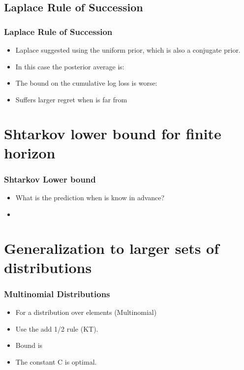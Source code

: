 \documentclass{beamer}
\begin{document}
\subsection{Laplace Rule of Succession}
\begin{frame}
\frametitle{Laplace Rule of Succession}
\begin{itemize}
\item
Laplace suggested using the uniform prior, which is also a conjugate prior.
\item In this case the posterior average is:
\R{\[
\frac{\int_0^1 \theta^{n+1} (1-\theta)^{t-n} d\theta}
{\int_0^1 \theta^{n} (1-\theta)^{t-n} d\theta}
=
\frac{n+1}{t+2}
\]}
\item
The bound on the cumulative log loss is worse:
\R{\[
\TAloss - \BEloss = \ln T + O(1)
\]}
\item
Suffers larger regret when \R{$\btheta$} is far from 
\end{itemize}
\end{frame}


\section{Shtarkov lower bound for finite horizon}

\begin{frame}
\frametitle{Shtarkov Lower bound}
\begin{itemize}
\item What is the  prediction when  is know in
  advance?
\item
{}
\end{itemize}
\end{frame}

\section{Generalization to larger sets of distributions}

\begin{frame}
\frametitle{Multinomial Distributions}
\begin{itemize}
\item For a distribution over  elements (Multinomial) 
\item Use the add 1/2 rule (KT).
\R{\[
p(i) = \frac{n_i+1/2}{t+k/2}
\]}
\item Bound is
\item 
The constant C is optimal.
\end{itemize}
\end{frame}
\end{document}
